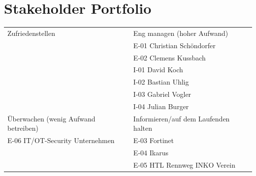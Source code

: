 \documentclass[
	headings=optiontotocandhead,%
	oneside,
	numbers=noenddot,%
	toc=flat, %
	10pt, %
	parskip=full, %
	listof=totoc, %
	listof=flat, %
	numbers=noenddot, %
	bibliography=totoc, %
	a4paper,DIV=14,
]{scrartcl}
\newcommand{\green}[1]{\textcolor[HTML]{00B050}{#1}}
\newcommand{\red}[1]{\textcolor[HTML]{FF0000}{#1}}
\begin{document}
\section{Stakeholder Portfolio}
\begin{table}[h]
\begin{tabularx} {\textwidth} {|X|X|}
\hline

\footnotesize{\textcolor[HTML]{A6A6A6}{Zufriedenstellen}}
& \footnotesize{\textcolor[HTML]{A6A6A6}{Eng managen (hoher Aufwand)}} \\ 
& \green {E-01 Christian Schöndorfer} \\
& \green {E-02 Clemens Kussbach} \\
& \green {I-01 David Koch} \\
& \green {I-02 Bastian Uhlig} \\
& \green {I-03 Gabriel Vogler} \\
& \green {I-04 Julian Burger}
 \\ \hline 

\footnotesize{\textcolor[HTML]{A6A6A6}{Überwachen (wenig Aufwand betreiben)}}
& \footnotesize{\textcolor[HTML]{A6A6A6}{Informieren/auf dem Laufenden halten}} \\
\red {E-06 IT/OT-Security Unternehmen} 
& \green {E-03 Fortinet} \\
& \green {E-04 Ikarus} \\
& \green {E-05 HTL Rennweg INKO Verein}

 
 \\ \hline 



\end{tabularx}
\end{table}
\end{document}
